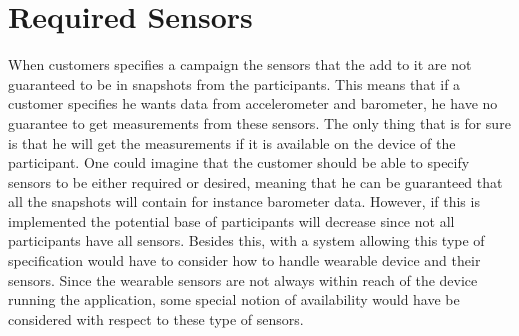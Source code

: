 
\section{Required Sensors}

When customers specifies a campaign the sensors that the add to it are not guaranteed to be in snapshots from the participants. This means that if a customer specifies he wants data from accelerometer and barometer, he have no guarantee to get measurements from these sensors. The only thing that is for sure is that he will get the measurements if it is available on the device of the participant. One could imagine that the customer should be able to specify sensors to be either required or desired, meaning that he can be guaranteed that all the snapshots will contain for instance barometer data. However, if this is implemented the potential base of participants will decrease since not all participants have all sensors. Besides this, with a system allowing this type of specification would have to consider how to handle wearable device and their sensors. Since the wearable sensors are not always within reach of the device running the application, some special notion of availability would have be considered with respect to these type of sensors.
